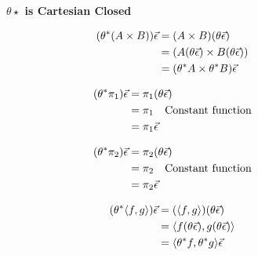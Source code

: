     
    \begin{figure}
        \centering
            \begin{framed}
                \centering\textbf{$\theta\star$ is Cartesian Closed}
    
                \begin{minipage}{.45\linewidth}
                    \begin{align*}
                        (\theta^*(A\times B))\vec{\epsilon} & = (A\times B)(\theta\vec{\epsilon})\\
                        & = (A(\theta \vec{\epsilon})\times B(\theta\vec{\epsilon}))\\
                        & = (\theta^* A\times \theta^* B)\vec{\epsilon}\\
                    \end{align*}              
                \end{minipage}
                \quad
                \begin{minipage}{.45\linewidth}
                    \begin{align*}
                        (\theta^* \pi_1)\vec{\epsilon} & = \pi_1(\theta\vec{\epsilon})\\
                        & = \pi_1 \quad\text{Constant function}\\
                        & = \pi_1\vec{\epsilon}
                    \end{align*}                
                \end{minipage}
    
    
                \begin{minipage}{.45\linewidth}
                    \begin{align*}
                        (\theta^* \pi_2)\vec{\epsilon} & = \pi_2(\theta\vec{\epsilon})\\
                        & = \pi_2 \quad\text{Constant function}\\
                        & = \pi_2\vec{\epsilon}
                    \end{align*}                
                \end{minipage}
                \quad
                \begin{minipage}{.45\linewidth}
                    \begin{align*}
                        (\theta^*\langle f, g\rangle)\vec{\epsilon} & = (\langle f, g\rangle)(\theta\vec{\epsilon})\\
                        & = \langle f(\theta\vec{\epsilon}), g(\theta\vec{\epsilon})\rangle\\
                        &= \langle\theta^* f, \theta^* g\rangle\vec{\epsilon}
                    \end{align*}
                \end{minipage}
    

\end{framed}
\end{figure}
